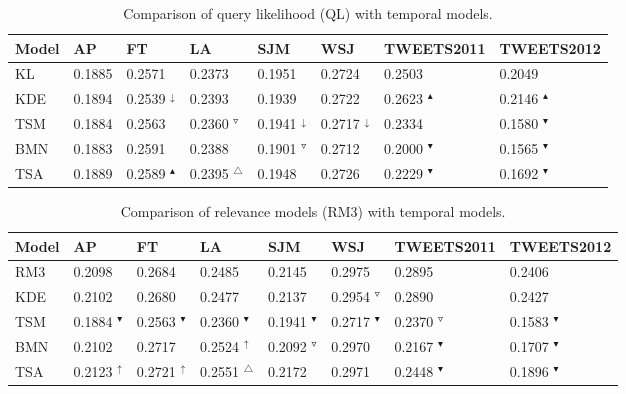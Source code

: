 \documentclass{sig-alternate}
\begin{document}
\begin{table*}[t]
\small
\caption{Comparison of query likelihood (QL) with temporal models. }
\begin{center}
\tabcolsep=0.11cm
\begin{tabular}{| l | l | l | l | l | l | l | l |}
\hline
\bf{Model}& \bf{AP} & \bf{FT} & \bf{LA} & \bf{SJM} & \bf{WSJ} & \bf{TWEETS2011} & \bf{TWEETS2012} \\ \hline 
KL & 0.1885  & 0.2571  & 0.2373  & 0.1951  & 0.2724  & 0.2503  & 0.2049 \\ \hline  \hline
KDE & 0.1894  & 0.2539 $^{\downarrow}$  & 0.2393  & 0.1939  & 0.2722  & 0.2623 $^{\blacktriangle}$  & 0.2146 $^{\blacktriangle}$ \\ \hline 
TSM & 0.1884  & 0.2563  & 0.2360 $^{\triangledown}$  & 0.1941 $^{\downarrow}$  & 0.2717 $^{\downarrow}$  & 0.2334  & 0.1580 $^{\blacktriangledown}$ \\ \hline 
BMN & 0.1883  & 0.2591  & 0.2388  & 0.1901 $^{\triangledown}$  & 0.2712  & 0.2000 $^{\blacktriangledown}$  & 0.1565 $^{\blacktriangledown}$ \\ \hline 
TSA & 0.1889  & 0.2589 $^{\blacktriangle}$  & 0.2395 $^{\triangle}$  & 0.1948  & 0.2726  & 0.2229 $^{\blacktriangledown}$  & 0.1692 $^{\blacktriangledown}$ \\ \hline 
\end{tabular}
\end{center}
\label{table.results.ql}
\normalsize
\end{table*}


\begin{table*}[t]
\small
\caption{Comparison of relevance models (RM3) with temporal models. }
\begin{center}
\tabcolsep=0.11cm
\begin{tabular}{| l | l | l | l | l | l | l | l |}
\hline
\bf{Model}& \bf{AP} & \bf{FT} & \bf{LA} & \bf{SJM} & \bf{WSJ} & \bf{TWEETS2011} & \bf{TWEETS2012} \\ \hline 
RM3 & 0.2098  & 0.2684  & 0.2485  & 0.2145  & 0.2975  & 0.2895  & 0.2406 \\ \hline  \hline
KDE & 0.2102  & 0.2680  & 0.2477  & 0.2137  & 0.2954 $^{\triangledown}$  & 0.2890  & 0.2427 \\ \hline 
TSM & 0.1884 $^{\blacktriangledown}$  & 0.2563 $^{\blacktriangledown}$  & 0.2360 $^{\blacktriangledown}$  & 0.1941 $^{\blacktriangledown}$  & 0.2717 $^{\blacktriangledown}$  & 0.2370 $^{\triangledown}$  & 0.1583 $^{\blacktriangledown}$ \\ \hline 
BMN & 0.2102  & 0.2717  & 0.2524 $^{\uparrow}$  & 0.2092 $^{\triangledown}$  & 0.2970  & 0.2167 $^{\blacktriangledown}$  & 0.1707 $^{\blacktriangledown}$ \\ \hline 
TSA & 0.2123 $^{\uparrow}$  & 0.2721 $^{\uparrow}$  & 0.2551 $^{\triangle}$  & 0.2172  & 0.2971  & 0.2448 $^{\blacktriangledown}$  & 0.1896 $^{\blacktriangledown}$ \\ \hline 
\end{tabular}
\end{center}
\label{table.results.rm3}
\normalsize
\end{table*}
\end{document}
